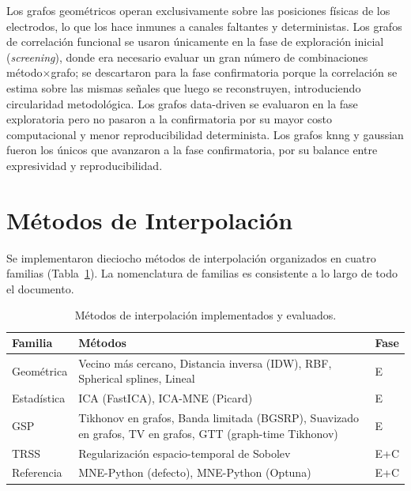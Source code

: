 Los grafos geométricos operan exclusivamente sobre las posiciones físicas de los electrodos, lo que los hace inmunes a canales faltantes y deterministas. Los grafos de correlación funcional se usaron únicamente en la fase de exploración inicial (\textit{screening}), donde era necesario evaluar un gran número de combinaciones método$\times$grafo; se descartaron para la fase confirmatoria porque la correlación se estima sobre las mismas señales que luego se reconstruyen, introduciendo circularidad metodológica. Los grafos data-driven se evaluaron en la fase exploratoria pero no pasaron a la confirmatoria por su mayor costo computacional y menor reproducibilidad determinista. Los grafos knng y gaussian fueron los únicos que avanzaron a la fase confirmatoria, por su balance entre expresividad y reproducibilidad.
\section{Métodos de Interpolación}
\label{sec:interpolation_methods}

Se implementaron dieciocho métodos de interpolación organizados en cuatro familias (Tabla~\ref{tab:methods}). La nomenclatura de familias es consistente a lo largo de todo el documento.

\begin{table}[htbp]
\centering
\caption{Métodos de interpolación implementados y evaluados.}
\label{tab:methods}
\small
\begin{tabular}{@{}lp{6.5cm}l@{}}
\toprule
Familia & Métodos & Fase \\
\midrule
Geométrica & Vecino más cercano, Distancia inversa (IDW), RBF, Spherical splines, Lineal & E \\
Estadística & ICA (FastICA), ICA-MNE (Picard) & E \\
GSP & Tikhonov en grafos, Banda limitada (BGSRP), Suavizado en grafos, TV en grafos, GTT (graph-time Tikhonov) & E \\
TRSS & Regularización espacio-temporal de Sobolev & E+C \\
Referencia & MNE-Python (defecto), MNE-Python (Optuna) & E+C \\
\bottomrule
\end{tabular}
\end{table}

